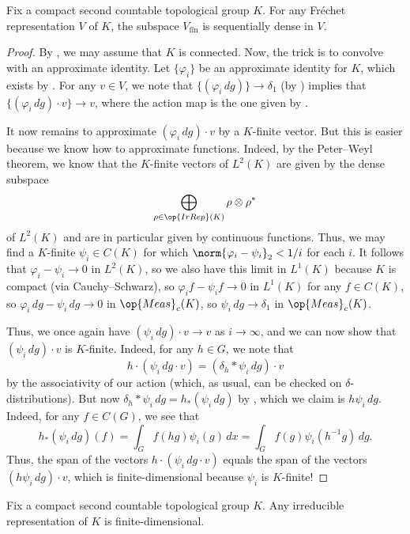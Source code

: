 \documentclass[../notes.tex]{subfiles}
\begin{document}
\begin{proposition} \label{prop:finite-is-dense}
	Fix a compact second countable topological group $K$. For any Fr\'echet representation $V$ of $K$, the subspace $V_{\mathrm{fin}}$ is sequentially dense in $V$.
\end{proposition}
\begin{proof}
	By , we may assume that $K$ is connected. Now, the trick is to convolve with an approximate identity. Let $\{\varphi_i\}$ be an approximate identity for $K$, which exists by . For any $v\in V$, we note that $\{(\varphi_i\,dg)\}\to\delta_1$ (by ) implies that $\{(\varphi_i\,dg)\cdot v\}\to v$, where the action map is the one given by .

	It now remains to approximate $(\varphi_i\,dg)\cdot v$ by a $K$-finite vector. But this is easier because we know how to approximate functions. Indeed, by the Peter--Weyl theorem, we know that the $K$-finite vectors of $L^2(K)$ are given by the dense subspace
	\[\bigoplus_{\rho\in\op{IrRep}(K)}\rho\otimes\rho^*\]
	of $L^2(K)$ and are in particular given by continuous functions. Thus, we may find a $K$-finite $\psi_i\in C(K)$ for which $\norm{\varphi_i-\psi_i}_2<1/i$ for each $i$. It follows that $\varphi_i-\psi_i\to0$ in $L^2(K)$, so we also have this limit in $L^1(K)$ because $K$ is compact (via Cauchy--Schwarz), so $\varphi_if-\psi_if\to0$ in $L^1(K)$ for any $f\in C(K)$, so $\varphi_i\,dg-\psi_i\,dg\to0$ in $\op{Meas}_c(K)$, so $\psi_i\,dg\to\delta_1$ in $\op{Meas}_c(K)$.

	Thus, we once again have $(\psi_i\,dg)\cdot v\to v$ as $i\to\infty$, and we can now show that $(\psi_i\,dg)\cdot v$ is $K$-finite. Indeed, for any $h\in G$, we note that
	\[h\cdot(\psi_i\,dg\cdot v)=(\delta_h*\psi_i\,dg)\cdot v\]
	by the associativity of our action (which, as usual, can be checked on $\delta$-distributions). But now $\delta_h*\psi_i\,dg=h_*(\psi_i\,dg)$ by , which we claim is $h\psi_i\,dg$. Indeed, for any $f\in C(G)$, we see that
	\[h_*(\psi_i\,dg)(f)=\int_Gf(hg)\psi_i(g)\,dx=\int_Gf(g)\psi_i\left(h^{-1}g\right)\,dg.\]
	Thus, the span of the vectors $h\cdot(\psi_i\,dg\cdot v)$ equals the span of the vectors $(h\psi_i\,dg)\cdot v$, which is finite-dimensional because $\psi_i$ is $K$-finite!
\end{proof}
\begin{corollary}
	Fix a compact second countable topological group $K$. Any irreducible representation of $K$ is finite-dimensional.
\end{corollary}
\end{document}
